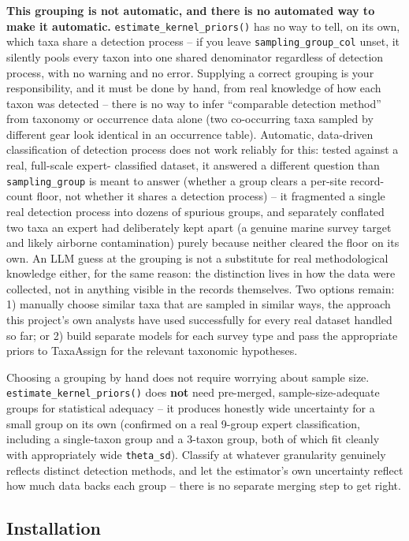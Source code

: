 \documentclass[
]{article}
\begin{document}
\textbf{This grouping is not automatic, and there is no automated way to
make it automatic.} \texttt{estimate\_kernel\_priors()} has no way to
tell, on its own, which taxa share a detection process -- if you leave
\texttt{sampling\_group\_col} unset, it silently pools every taxon into
one shared denominator regardless of detection process, with no warning
and no error. Supplying a correct grouping is your responsibility, and
it must be done by hand, from real knowledge of how each taxon was
detected -- there is no way to infer ``comparable detection method''
from taxonomy or occurrence data alone (two co-occurring taxa sampled by
different gear look identical in an occurrence table). Automatic,
data-driven classification of detection process does not work reliably
for this: tested against a real, full-scale expert- classified dataset,
it answered a different question than \texttt{sampling\_group} is meant
to answer (whether a group clears a per-site record-count floor, not
whether it shares a detection process) -- it fragmented a single real
detection process into dozens of spurious groups, and separately
conflated two taxa an expert had deliberately kept apart (a genuine
marine survey target and likely airborne contamination) purely because
neither cleared the floor on its own. An LLM guess at the grouping is
not a substitute for real methodological knowledge either, for the same
reason: the distinction lives in how the data were collected, not in
anything visible in the records themselves. Two options remain: 1)
manually choose similar taxa that are sampled in similar ways, the
approach this project's own analysts have used successfully for every
real dataset handled so far; or 2) build separate models for each survey
type and pass the appropriate priors to TaxaAssign for the relevant
taxonomic hypotheses.

Choosing a grouping by hand does not require worrying about sample size.
\texttt{estimate\_kernel\_priors()} does \textbf{not} need pre-merged,
sample-size-adequate groups for statistical adequacy -- it produces
honestly wide uncertainty for a small group on its own (confirmed on a
real 9-group expert classification, including a single-taxon group and a
3-taxon group, both of which fit cleanly with appropriately wide
\texttt{theta\_sd}). Classify at whatever granularity genuinely reflects
distinct detection methods, and let the estimator's own uncertainty
reflect how much data backs each group -- there is no separate merging
step to get right.

\subsection{Installation}\label{installation}
\end{document}
